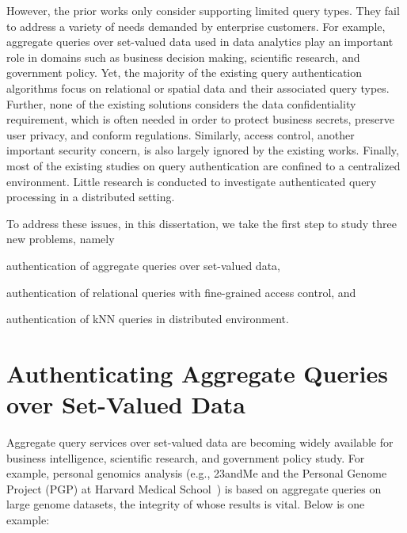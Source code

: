 However, the prior works only consider supporting limited query types. They fail to address a variety of needs demanded by enterprise customers. For example, aggregate queries over set-valued data used in data analytics play an important role in domains such as business decision making, scientific research, and government policy. Yet, the majority of the existing query authentication algorithms focus on relational or spatial data and their associated query types. Further, none of the existing solutions considers the data confidentiality requirement, which is often needed in order to protect business secrets, preserve user privacy, and conform regulations. Similarly, access control, another important security concern, is also largely ignored by the existing works. Finally, most of the existing studies on query authentication are confined to a centralized environment. Little research is conducted to investigate authenticated query processing in a distributed setting.

To address these issues, in this dissertation, we take the first step to study three new problems, namely
\begin{inlineenum}
  \item authentication of aggregate queries over set-valued data,
  \item authentication of relational queries with fine-grained access control, and
  \item authentication of {kNN} queries in distributed environment.
\end{inlineenum}

\section{Authenticating Aggregate Queries over Set-Valued Data}

Aggregate query services over set-valued data are becoming widely available for business intelligence, scientific research, and government policy study. For example, personal genomics analysis (e.g., 23andMe and the Personal Genome Project (PGP) at Harvard Medical School~\cite{pgp}) is based on aggregate queries on large genome datasets, the integrity of whose results is vital. Below is one example:

